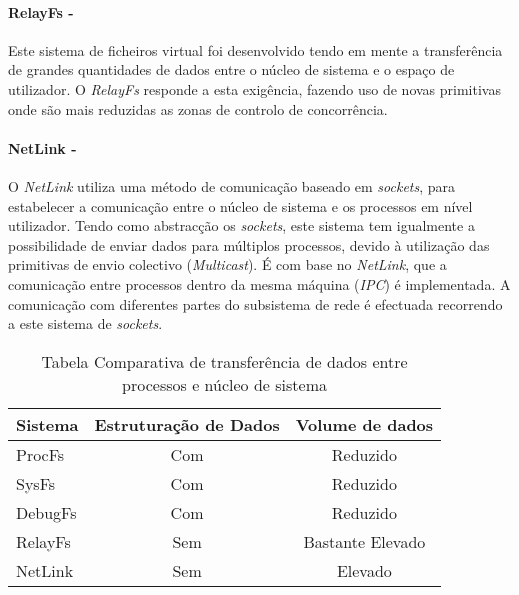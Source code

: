 \paragraph*{RelayFs - }\label{cap:RelayFs_overview}

Este sistema de ficheiros virtual foi desenvolvido tendo em mente a transferência de grandes quantidades de dados entre o núcleo de sistema e o espaço de utilizador.
O \textit{RelayFs} responde a esta exigência, fazendo uso de novas primitivas onde são mais reduzidas as zonas de controlo de concorrência\cite{Donovan2007}.

\paragraph*{NetLink - }\label{cap:NetLink_overview}
O \textit{NetLink} utiliza uma método de comunicação baseado em \textit{sockets}, para estabelecer a comunicação entre o núcleo de sistema e os processos em nível utilizador. 
 Tendo como abstracção os \textit{sockets}, este sistema tem igualmente a possibilidade de enviar dados para múltiplos processos, devido à utilização das primitivas de envio colectivo (\textit{Multicast}).
 É com base no \textit{NetLink}, que a comunicação entre processos dentro da mesma máquina (\textit{IPC}) é implementada.
 A comunicação com diferentes partes do subsistema de rede é efectuada recorrendo a este sistema de \textit{sockets}.




\begin{table}[h]
\begin{center}

\begin{tabular}{|l||c|c|}
\hline
Sistema & Estruturação de Dados & Volume de dados \\
\hline
ProcFs & Com & Reduzido \\
\hline
SysFs & Com & Reduzido \\
\hline
DebugFs & Com & Reduzido \\
\hline
RelayFs & Sem & Bastante Elevado \\
\hline
NetLink & Sem & Elevado \\
\hline
\end{tabular}
\caption{Tabela Comparativa de transferência de dados entre processos e núcleo de sistema}
\label{tab:transf_compare}
\end{center}
\end{table}

